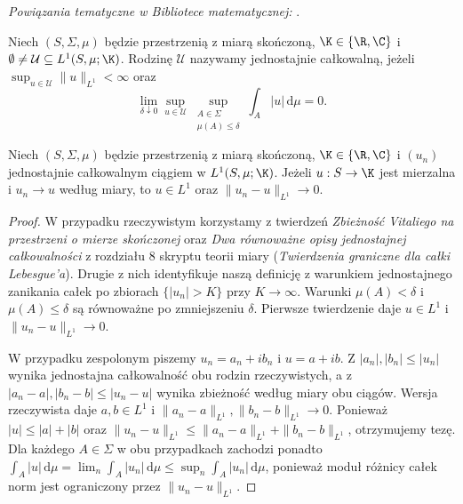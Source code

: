 \noindent\emph{Powiązania tematyczne w Bibliotece matematycznej:} .


\begin{definicja}
\label{def:uniform-integrability15b}
Niech $(S,\Sigma,\mu)$ będzie przestrzenią z miarą skończoną,
$\K\in\{\R,\C\}$ i $\emptyset\ne\mathcal U\subseteq L^1(S,\mu;\K)$.
Rodzinę $\mathcal U$ nazywamy jednostajnie całkowalną,
jeżeli $\sup_{u\in\mathcal U}\|u\|_{L^1}<\infty$ oraz
\[
 \lim_{\delta\downarrow0}\sup_{u\in\mathcal U}
 \sup_{\substack{A\in\Sigma\\\mu(A)\le\delta}}
 \int_A|u|\,\mathrm d\mu=0.
\]
\end{definicja}

\begin{lemat}
\label{lem:scalar-vitali15b}
Niech $(S,\Sigma,\mu)$ będzie przestrzenią z miarą
skończoną, $\K\in\{\R,\C\}$ i $(u_n)$ jednostajnie
całkowalnym ciągiem w $L^1(S,\mu;\K)$. Jeżeli $u:S\to\K$
jest mierzalna i $u_n\to u$ według miary, to $u\in L^1$
oraz $\|u_n-u\|_{L^1}\to0$.
\end{lemat}
\begin{proof}
W przypadku rzeczywistym korzystamy z twierdzeń
\emph{Zbieżność Vitaliego na przestrzeni o mierze skończonej}
oraz \emph{Dwa równoważne opisy jednostajnej całkowalności}
z rozdziału 8 skryptu teorii miary (\emph{Twierdzenia
graniczne dla całki Lebesgue'a}). Drugie z nich identyfikuje
naszą definicję z warunkiem jednostajnego zanikania całek
po zbiorach $\{|u_n|>K\}$ przy $K\to\infty$.
Warunki $\mu(A)<\delta$ i $\mu(A)\le\delta$ są równoważne
po zmniejszeniu $\delta$. Pierwsze twierdzenie daje
$u\in L^1$ i $\|u_n-u\|_{L^1}\to0$.

W przypadku zespolonym piszemy $u_n=a_n+ib_n$ i $u=a+ib$.
Z $|a_n|,|b_n|\le|u_n|$ wynika jednostajna całkowalność
obu rodzin rzeczywistych, a z $|a_n-a|,|b_n-b|\le|u_n-u|$
wynika zbieżność według miary obu ciągów.
Wersja rzeczywista daje $a,b\in L^1$ i
$\|a_n-a\|_{L^1},\|b_n-b\|_{L^1}\to0$.
Ponieważ $|u|\le|a|+|b|$ oraz
$\|u_n-u\|_{L^1}\le\|a_n-a\|_{L^1}+\|b_n-b\|_{L^1}$,
otrzymujemy tezę. Dla każdego $A\in\Sigma$ w obu
przypadkach zachodzi ponadto
$\int_A|u|\,\mathrm d\mu=\lim_n\int_A|u_n|\,\mathrm d\mu
\le\sup_n\int_A|u_n|\,\mathrm d\mu$, ponieważ moduł różnicy
całek norm jest ograniczony przez $\|u_n-u\|_{L^1}$.
\end{proof}

